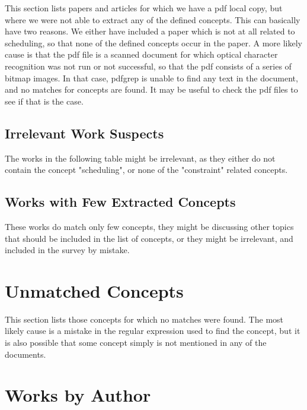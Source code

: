 \documentclass[a4paper]{article}
\begin{document}
This section lists papers and articles for which we have a pdf local copy, but where we were not able to extract any of the defined concepts. This can basically have two reasons. We either have included a paper which is not at all related to scheduling, so that none of the defined concepts occur in the paper. A  more likely cause is that the pdf file is a scanned document for which optical character recognition was not run or not successful, so that the pdf consists of a series of bitmap images. In that case, pdfgrep is unable to find any text in the document, and no matches for concepts are found. It may be useful to check the pdf files to see if that is the case.





\subsection{Irrelevant Work Suspects}
The works in the following table might be irrelevant, as they either do not contain the concept "scheduling", or none of the "constraint" related concepts.




\subsection{Works with Few Extracted Concepts}

These works do match only few concepts, they might be discussing other topics that should be included in the list of concepts, or they might be irrelevant, and included in the survey by mistake.




\clearpage
\section{Unmatched Concepts}

This section lists those concepts for which no matches were found. The most likely cause is a mistake in the regular expression used to find the concept, but it is also possible that some concept simply is not mentioned in any of the documents. 



\clearpage
\section{Works by Author}
\end{document}
